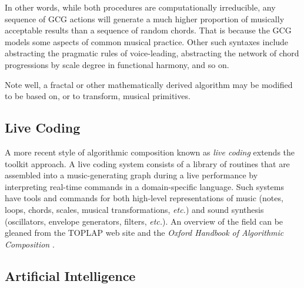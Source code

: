 \documentclass[]{interact}
\theoremstyle{plain}%
\theoremstyle{definition}
\theoremstyle{remark}
\begin{document}
In other words, while both procedures are computationally irreducible, any sequence of GCG actions will generate a much higher proportion of musically acceptable results than a sequence of random chords. That is because the GCG models some aspects of common musical practice. Other such syntaxes include abstracting the pragmatic rules of voice-leading, abstracting the network of chord progressions by scale degree in functional harmony, and so on.

Note well, a fractal or other mathematically derived algorithm may be modified to be based on, or to transform, musical primitives.

\subsection{Live Coding}

A more recent style of algorithmic composition known as \emph{live coding} extends the toolkit approach. A live coding system consists of a library of routines that are assembled into a music-generating graph during a live performance by interpreting real-time commands in a domain-specific language. Such systems have tools and commands for both high-level representations of music (notes, loops, chords, scales, musical transformations, \emph{etc.}) and sound synthesis (oscillators, envelope generators, filters, \emph{etc.}). An overview of the field can be gleaned from the TOPLAP web site \citep{toplap} and the \emph{Oxford Handbook of Algorithmic Composition} \citep{mclean2018oxford}.

\subsection{Artificial Intelligence}
\end{document}
